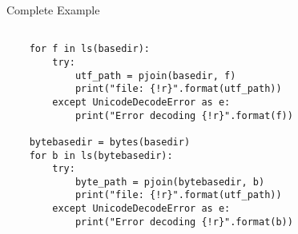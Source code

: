 \begin{frame}[fragile]{Complete Example}
\begin{verbatim}

    for f in ls(basedir):
        try:
            utf_path = pjoin(basedir, f)
            print("file: {!r}".format(utf_path))
        except UnicodeDecodeError as e:
            print("Error decoding {!r}".format(f))

    bytebasedir = bytes(basedir)
    for b in ls(bytebasedir):
        try:
            byte_path = pjoin(bytebasedir, b)
            print("file: {!r}".format(utf_path))
        except UnicodeDecodeError as e:
            print("Error decoding {!r}".format(b))
    
\end{verbatim}
\end{frame}
